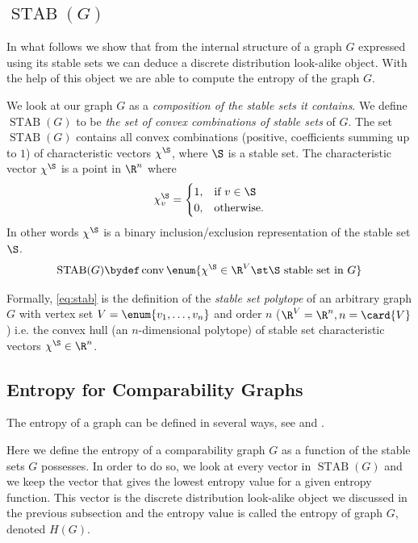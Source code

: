 \subsection{$\operatorname{STAB}(G)$}
\label{tree:poset:graph:stab}

In what follows we show that from the internal structure of a graph $G$
expressed using its stable sets we can deduce a discrete distribution
look-alike object. With the help of this object we are able to compute the
entropy of the graph $G$.

We look at our graph $G$ as a \emph{composition of the
stable sets it contains}. We define $\operatorname{STAB}(G)$ to be \emph{the set of convex
combinations of stable sets} of $G$.
The set $\operatorname{STAB}(G)$ contains all convex combinations (positive,
coefficients summing up to $1$) of characteristic vectors $\chi^{\S}$, where $\S$
is a stable set. The characteristic vector $\chi^{\S}$ is a point in $\R^n$ where
\begin{displaymath}
\chi^{\S}_v =\begin{cases}
      1, & \text{if}\ v \in \S\\
      0, & \text{otherwise}.
    \end{cases}
\end{displaymath}
In other words $\chi^{\S}$ is a binary inclusion/exclusion representation of the
stable set $\S$.
\begin{equation}
\operatorname{STAB}(G) \bydef \operatorname{conv}\enum{\chi^{\S} \in \R^V \st
\S\text{ stable set in }G}
\label{eq:stab}
\end{equation}

Formally, \ref{eq:stab} is the definition of the \emph{stable set polytope} of
an arbitrary graph $G$ with vertex set $V = \enum{v_1, \ldots, v_n }$
and order $n$ ($\R^V = \R^n, n = \card{V}$) i.e. the convex hull (an $n$-dimensional
polytope) of stable set characteristic vectors $\chi^{\S} \in \R^n$.



\subsection{Entropy for Comparability Graphs}

The entropy of a graph can be defined in several ways, see
\citet*{mowshowitz2012entropy} and \citet*{simonyi1995graph}.

Here we define the entropy of a comparability graph $G$ as a function of the
stable sets $G$ possesses. In order to do so, we look at every vector in
$\operatorname{STAB}(G)$ and we keep the vector that gives the lowest entropy
value for a given entropy function. This vector is the discrete distribution
look-alike object we discussed in the previous subsection and the
entropy value is called the entropy of graph $G$, denoted ${H}(G)$.

